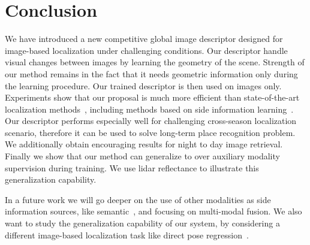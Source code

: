 \section{Conclusion}
\label{sec:conclusion}

We have introduced a new competitive global image descriptor designed for image-based localization under challenging conditions. Our descriptor handle visual changes between images by learning the geometry of the scene. Strength of our method remains in the fact that it needs geometric information only during the learning procedure. Our trained descriptor is then used on images only. Experiments show that our proposal is much more efficient than state-of-the-art localization methods~\cite{Arandjelovic2017, Radenovic2017}, including methods based on side information learning~\cite{Hoffman2016}. Our descriptor performs especially well for challenging cross-season localization scenario, therefore it can be used to solve long-term place recognition problem. We additionally obtain encouraging results for night to day image retrieval. Finally we show that our method can generalize to over auxiliary modality supervision during training. We use lidar reflectance to illustrate this generalization capability.

In a future work we will go deeper on the use of other modalities as side information sources, like semantic~\cite{Seymour2018}, and focusing on multi-modal fusion. We also want to study the generalization capability of our system, by considering a different image-based localization task like direct pose regression~\cite{Brachmann2018}.